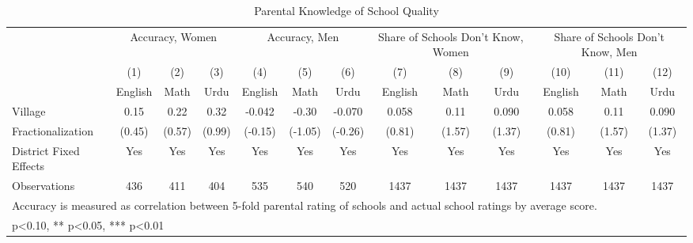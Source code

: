 \begin{sidewaystable}[htbp]\centering
\def\sym#1{\ifmmode^{#1}\else\(^{#1}\)\fi}
\caption{Parental Knowledge of School Quality\label{knowledge}}
\begin{tabular}{l*{12}{c}}
\toprule
                &\multicolumn{3}{c}{Accuracy, Women}   &\multicolumn{3}{c}{Accuracy, Men}     &\multicolumn{3}{c}{Share of Schools Don't Know, Women}&\multicolumn{3}{c}{Share of Schools Don't Know, Men}\\\cmidrule(lr){2-4}\cmidrule(lr){5-7}\cmidrule(lr){8-10}\cmidrule(lr){11-13}
                &\multicolumn{1}{c}{(1)}&\multicolumn{1}{c}{(2)}&\multicolumn{1}{c}{(3)}&\multicolumn{1}{c}{(4)}&\multicolumn{1}{c}{(5)}&\multicolumn{1}{c}{(6)}&\multicolumn{1}{c}{(7)}&\multicolumn{1}{c}{(8)}&\multicolumn{1}{c}{(9)}&\multicolumn{1}{c}{(10)}&\multicolumn{1}{c}{(11)}&\multicolumn{1}{c}{(12)}\\
                &\multicolumn{1}{c}{English}&\multicolumn{1}{c}{Math}&\multicolumn{1}{c}{Urdu}&\multicolumn{1}{c}{English}&\multicolumn{1}{c}{Math}&\multicolumn{1}{c}{Urdu}&\multicolumn{1}{c}{English}&\multicolumn{1}{c}{Math}&\multicolumn{1}{c}{Urdu}&\multicolumn{1}{c}{English}&\multicolumn{1}{c}{Math}&\multicolumn{1}{c}{Urdu}\\
\midrule
Village         &     0.15   &     0.22   &     0.32   &   -0.042   &    -0.30   &   -0.070   &    0.058   &     0.11   &    0.090   &    0.058   &     0.11   &    0.090   \\
Fractionalization&   (0.45)   &   (0.57)   &   (0.99)   &  (-0.15)   &  (-1.05)   &  (-0.26)   &   (0.81)   &   (1.57)   &   (1.37)   &   (0.81)   &   (1.57)   &   (1.37)   \\
District Fixed Effects &      Yes   &      Yes   &      Yes   &      Yes   &      Yes   &      Yes   &      Yes   &      Yes   &      Yes   &      Yes   &      Yes   &      Yes   \\
\midrule
Observations    &      436   &      411   &      404   &      535   &      540   &      520   &     1437   &     1437   &     1437   &     1437   &     1437   &     1437   \\
\bottomrule
\multicolumn{13}{l}{\footnotesize Accuracy is measured as correlation between 5-fold parental rating of schools and actual school ratings by average score.}\\
\multicolumn{13}{l}{\footnotesize * p<0.10, ** p<0.05, *** p<0.01}\\
\end{tabular}
\end{sidewaystable}
